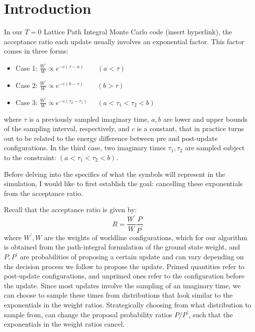 \documentclass[12pt, two sided]{article}
\begin{document}


\section{Introduction}

In our $T=0$ Lattice Path Integral Monte Carlo code (insert hyperlink), the acceptance ratio each update usually involves an exponential factor. This factor comes in three forms:

\begin{itemize}
 \item Case 1: $\frac{W^\prime}{W} \propto e^{-c(\tau-a)} \;\;\;\;\;\;\; (a<\tau)$ \\
 \item Case 2: $\frac{W^\prime}{W} \propto e^{-c(b-\tau)} \;\;\;\;\;\;\; (b>\tau)$ \\
 \item Case 3: $\frac{W^\prime}{W} \propto e^{-c(\tau_2-\tau_1)} \;\;\;\;\; (a < \tau_1 < \tau_2 < b)$ 
 \end{itemize}

where $\tau$ is a previously sampled imaginary time, $a,b$ are lower and upper bounds of the sampling interval, respectively, and $c$ is a constant, that in practice turns out to be related to the energy difference between pre and post-update configurations. In the third case, two imaginary times $\tau_1, \tau_2$ are sampled subject to the constraint: $(a<\tau_1<\tau_2<b)$.

Before delving into the specifics of what the symbols will represent in the simulation, I would like to first establish the goal: cancelling these exponentials from the acceptance ratio. 

Recall that the acceptance ratio is given by:
%
\begin{equation}
R = \frac{W^\prime}{W} \frac{P}{P^\prime}
\end{equation}
%
where $W^\prime,W$ are the weights of worldline configurations, which for our algorithm is obtained from the path-integral formulation of the ground state weight, and $P,P^\prime$ are probabilities of proposing a certain update and can vary depending on the decision process we follow to propose the update. Primed quantities refer to post-update configurations, and unprimed ones refer to the configuration before the update. Since most updates involve the sampling of an imaginary time, we can choose to sample these times from distributions that look similar to the exponentials in the weight ratios. Strategically choosing from what distribution to sample from, can change the proposal probability ratios $P/P^\prime$, such that the exponentials in the weight ratios cancel.
\end{document}
